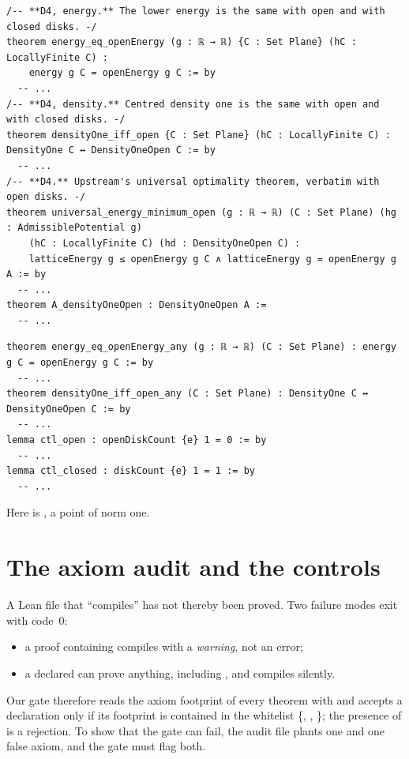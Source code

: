 \begin{leanbox}
\begin{lstlisting}[language=Lean]
/-- **D4, energy.** The lower energy is the same with open and with closed disks. -/
theorem energy_eq_openEnergy (g : ℝ → ℝ) {C : Set Plane} (hC : LocallyFinite C) :
    energy g C = openEnergy g C := by
  -- ...
/-- **D4, density.** Centred density one is the same with open and with closed disks. -/
theorem densityOne_iff_open {C : Set Plane} (hC : LocallyFinite C) : DensityOne C ↔ DensityOneOpen C := by
  -- ...
/-- **D4.** Upstream's universal optimality theorem, verbatim with open disks. -/
theorem universal_energy_minimum_open (g : ℝ → ℝ) (C : Set Plane) (hg : AdmissiblePotential g)
    (hC : LocallyFinite C) (hd : DensityOneOpen C) :
    latticeEnergy g ≤ openEnergy g C ∧ latticeEnergy g = openEnergy g A := by
  -- ...
theorem A_densityOneOpen : DensityOneOpen A :=
  -- ...
\end{lstlisting}
\end{leanbox}

\begin{leanbox}
\begin{lstlisting}[language=Lean]
theorem energy_eq_openEnergy_any (g : ℝ → ℝ) (C : Set Plane) : energy g C = openEnergy g C := by
  -- ...
theorem densityOne_iff_open_any (C : Set Plane) : DensityOne C ↔ DensityOneOpen C := by
  -- ...
lemma ctl_open : openDiskCount {e} 1 = 0 := by
  -- ...
lemma ctl_closed : diskCount {e} 1 = 1 := by
  -- ...
\end{lstlisting}
\end{leanbox}
Here  is , a point of norm one.

\section{The axiom audit and the controls}\label{ch2:sec:audit}

A Lean file that ``compiles'' has not thereby been proved. Two failure modes exit with code~$0$:
\begin{itemize}
\item a proof containing  compiles with a \emph{warning}, not an error;
\item a declared  can prove anything, including , and compiles silently.
\end{itemize}
Our gate therefore reads the axiom footprint of every theorem with  and accepts a declaration only if
its footprint is contained in the whitelist \{, , \}; the
presence of  is a rejection. To show that the gate can fail, the audit file plants one  and
one false axiom, and the gate must flag both.

